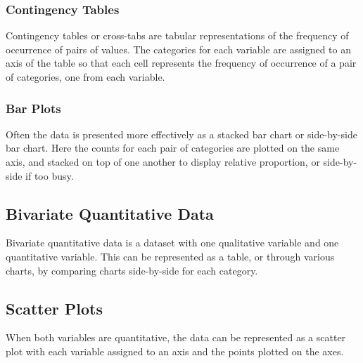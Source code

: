 \documentclass{article}
\begin{document}
\subsubsection{Contingency Tables}
Contingency tables or cross-tabs are tabular representations of the
frequency of occurrence of pairs of values. The categories for each
variable are assigned to an axis of the table so that each cell
represents the frequency of occurrence of a pair of categories, one
from each variable.
\subsubsection{Bar Plots}
Often the data is presented more effectively as a stacked bar chart or
side-by-side bar chart. Here the counts for each pair of categories are
plotted on the same axis, and stacked on top of one another to display
relative proportion, or side-by-side if too busy.
\subsection{Bivariate Quantitative Data}
Bivariate quantitative data is a dataset with one qualitative variable
and one quantitative variable. This can be represented as a table, or
through various charts, by comparing charts side-by-side for each
category.
\subsection{Scatter Plots}
When both variables are quantitative, the data can be represented as a
scatter plot with each variable assigned to an axis and the points
plotted on the axes.
\end{document}
